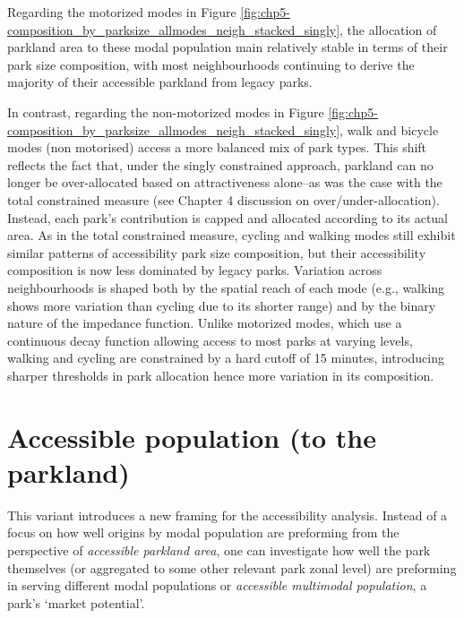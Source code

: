 \documentclass[
11pt, %
oneside, %
english, %
singlespacing, %
]{macthesis} %
\begin{document}
Regarding the motorized modes in Figure \ref{fig:chp5-composition_by_parksize_allmodes_neigh_stacked_singly}, the allocation of parkland area to these modal population main relatively stable in terms of their park size composition, with most neighbourhoods continuing to derive the majority of their accessible parkland from legacy parks.

In contrast, regarding the non-motorized modes in Figure \ref{fig:chp5-composition_by_parksize_allmodes_neigh_stacked_singly}, walk and bicycle modes (non motorised) access a more balanced mix of park types. This shift reflects the fact that, under the singly constrained approach, parkland can no longer be over-allocated based on attractiveness alone--as was the case with the total constrained measure (see Chapter 4 discussion on over/under-allocation). Instead, each park's contribution is capped and allocated according to its actual area. As in the total constrained measure, cycling and walking modes still exhibit similar patterns of accessibility park size composition, but their accessibility composition is now less dominated by legacy parks. Variation across neighbourhoods is shaped both by the spatial reach of each mode (e.g., walking shows more variation than cycling due to its shorter range) and by the binary nature of the impedance function. Unlike motorized modes, which use a continuous decay function allowing access to most parks at varying levels, walking and cycling are constrained by a hard cutoff of 15 minutes, introducing sharper thresholds in park allocation hence more variation in its composition.

\section{Accessible population (to the parkland)}\label{accessible-population-to-the-parkland-1}

This variant introduces a new framing for the accessibility analysis. Instead of a focus on how well origins by modal population are preforming from the perspective of \emph{accessible parkland area}, one can investigate how well the park themselves (or aggregated to some other relevant park zonal level) are preforming in serving different modal populations or \emph{accessible multimodal population}, a park's `market potential'.
\end{document}
